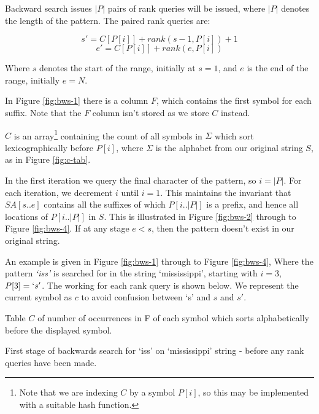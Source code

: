 Backward search issues $|P|$ pairs of rank queries will be issued, where $|P|$ 
denotes the length of the pattern. The paired rank queries are:

					$$ s' = C[P[i]] + rank(s - 1, P[i]) + 1$$
					$$ e' = C[P[i]] + rank(e, P[i])$$

Where $s$ denotes the start of the range, initially at $s = 1$, and $e$ is the 
end of the range, initially $e = N$.

In Figure \ref{fig:bws-1} there is a column $F$, which contains the first 
symbol for each suffix. Note that the $F$ column isn't stored as we store 
$C$ instead.

$C$ is an array\footnote{Note that we are indexing $C$ by a symbol $P[i]$, so 
this may be implemented with a suitable hash function.} containing the count of 
all symbols in $\Sigma$ which sort lexicographically before $P[i]$, where 
$\Sigma$ is the alphabet from our original string $S$, as in Figure 
\ref{fig:c-tab}.

In the first iteration 
we query the final character of the pattern, so $i = |P|$.  For each 
iteration, we decrement $i$ until $i = 1$. This maintains the invariant that
$SA[s..e]$ contains all the suffixes of which $P[i..|P|]$ is a prefix, and hence
all locations of $P[i..|P|]$ in $S$. This is illustrated in Figure 
\ref{fig:bws-2} through to Figure \ref{fig:bws-4}. If at any stage $e < 
s$, then the pattern doesn't exist in our original string.

An example is given in Figure \ref{fig:bws-1} through to Figure \ref{fig:bws-4},
Where the pattern \emph{`iss'} is searched for in the string `mississippi',
starting with $i = 3$, $P[3] = `s'$. The working for each rank query is shown 
below. We represent the current symbol as $c$ to avoid confusion between `s' and 
$s$ and $s'$.


			{Table $C$ of number of occurrences in F of each symbol which
			sorts alphabetically before the displayed symbol.}

\clearpage			
			{First stage of backwards search for `iss' on `mississippi'
			 string - before any rank queries have been made.}

